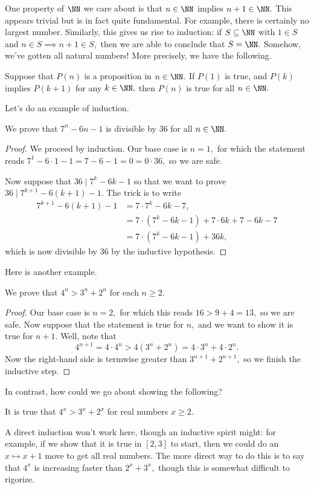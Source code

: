 One property of $\NN$ we care about is that $n\in\NN$ implies $n+1\in\NN.$ This appears trivial but is in fact quite fundamental. For example, there is certainly no largest number. Similarly, this gives us rise to induction: if $S\subseteq\NN$ with $1\in S$ and $n\in S\implies n+1\in S,$ then we are able to conclude that $S=\NN.$ Somehow, we've gotten all natural numbers! More precisely, we have the following.
\begin{ax}
	Suppose that $P(n)$ is a proposition in $n\in\NN.$ If $P(1)$ is true, and $P(k)$ implies $P(k+1)$ for any $k\in\NN,$ then $P(n)$ is true for all $n\in\NN.$
\end{ax}
Let's do an example of induction.
\begin{prop}[Ross 1.7]
	We prove that $7^n-6n-1$ is divisible by $36$ for all $n\in\NN.$
\end{prop}
\begin{proof}
	We proceed by induction. Our base case is $n=1,$ for which the statement reads $7^1-6\cdot1-1=7-6-1=0=0\cdot36,$ so we are safe.
	
	Now suppose that $36\mid7^k-6k-1$ so that we want to prove $36\mid7^{k+1}-6(k+1)-1.$ The trick is to write
	\begin{align*}
		7^{k+1}-6(k+1)-1 &= 7\cdot7^k-6k-7, \\
		&= 7\cdot\left(7^k-6k-1\right)+7\cdot6k+7-6k-7 \\
		&= 7\cdot\left(7^k-6k-1\right)+36k,
	\end{align*}
	which is now divisible by $36$ by the inductive hypothesis.
\end{proof}

Here is another example.
\begin{prop}
    We prove that $4^n>3^n+2^n$ for each $n\ge2.$
\end{prop}
\begin{proof}
    Our base case is $n=2,$ for which this reads $16>9+4=13,$ so we are safe. Now suppose that the statement is true for $n,$ and we want to show it is true for $n+1.$ Well, note that
    \[4^{n+1}=4\cdot4^n>4\left(3^n+2^n\right)=4\cdot3^n+4\cdot2^n.\]
    Now the right-hand side is termwise greater than $3^{n+1}+2^{n+1},$ so we finish the inductive step.
\end{proof}
In contrast, how could we go about showing the following?
\begin{prop}
    It is true that $4^x>3^x+2^x$ for real numbers $x\ge2.$
\end{prop}
A direct induction won't work here, though an inductive spirit might: for example, if we show that it is true in $[2,3]$ to start, then we could do an $x\mapsto x+1$ move to get all real numbers. The more direct way to do this is to say that $4^x$ is increasing faster than $2^x+3^x,$ though this is somewhat difficult to rigorize.